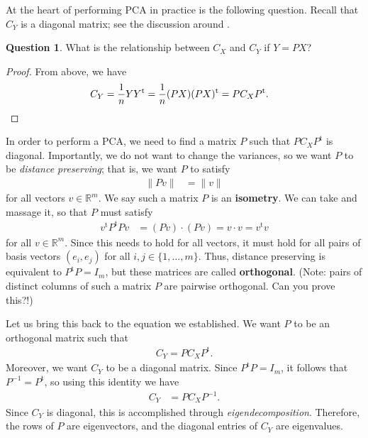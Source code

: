 \documentclass[a4paper, 12pt]{article}
\numberwithin{equation}{section}
\numberwithin{figure}{section}
\theoremstyle{definition}
\newtheorem{quest}[thm]{Question}
\newcommand{\R}{\mathbb{R}}
\newcommand{\tr}{\mathrm{t}}
\begin{document}
At the heart of performing PCA in practice is the following question. Recall
that $C_Y$ is a diagonal matrix; see the discussion around .

\begin{quest} 
	What is the relationship between $C_X$ and $C_Y$ if $Y = PX$? 
\end{quest}

\begin{proof}
	From above, we have
	\begin{align*}
		C_Y &= \dfrac{1}{n} YY^{\tr} = \dfrac{1}{n} (PX)(PX)^{\tr} = P C_X P^{\tr}. \qedhere
	\end{align*}
\end{proof}

In order to perform a PCA, we need to find a matrix $P$ such that $PC_XP^{\tr}$
is diagonal. Importantly, we do not want to change the variances, so we want $P$
to be \textit{distance preserving}; that is, we want $P$ to satisfy
\begin{align}\label{eqn:dist-preserve}
	\| Pv \| &= \| v\|
\end{align}
for all vectors $v\in\R^m$. We say such a matrix $P$ is an \textbf{isometry}. We
can take  and massage it, so that $P$ must satisfy 
\begin{align*}
	v^{\tr} P^{\tr} P v &= (Pv)\cdot (Pv) = v\cdot v = v^{\tr} v
\end{align*}
for all $v\in \R^m$. Since this needs to hold for all vectors, it must hold for
all pairs of basis vectors $(e_i,e_j)$ for all $i,j\in\{1,\dots, m\}$. Thus,
distance preserving is equivalent to $P^{\tr}P = I_m$, but these matrices are
called \textbf{orthogonal}. (Note: pairs of distinct columns of such a matrix
$P$ are pairwise orthogonal. Can you prove this?!) 

Let us bring this back to the equation we established. We want $P$ to be an
orthogonal matrix such that 
\begin{align}\label{eqn:CY-CX}
	C_Y = PC_XP^{\tr} .
\end{align} 
Moreover, we want $C_Y$ to be a diagonal matrix. Since $P^{\tr}P=I_m$, it
follows that $P^{-1} = P^{\tr}$, so using this identity we have 
\begin{align*}
	C_Y &= PC_XP^{-1}.
\end{align*}
Since $C_Y$ is diagonal, this is accomplished through
\textit{eigendecomposition}. Therefore, the rows of $P$ are eigenvectors, and
the diagonal entries of $C_Y$ are eigenvalues.
\end{document}
